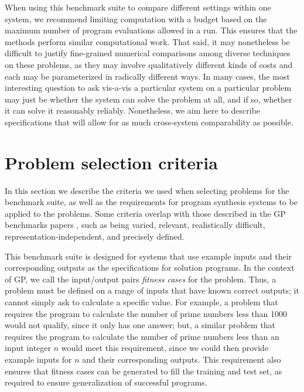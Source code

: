 \documentclass{sig-alternate}
\begin{document}
When using this benchmark suite to compare different settings within one system, we recommend limiting computation with a budget based on the maximum number of program evaluations allowed in a run. This ensures that the methods perform similar computational work. That said, it may nonetheless be difficult to justify fine-grained numerical comparisons among diverse techniques on these problems, as they may involve qualitatively different kinds of costs and each may be parameterized in radically different ways. In many cases, the most interesting question to ask vis-a-vis a particular system on a particular problem may just be whether the system can solve the problem at all, and if so,  whether it can solve it reasonably reliably. Nonetheless, we aim here to describe specifications that will allow for as much cross-system comparability as possible. %


\section{Problem selection criteria} \label{requirements}

In this section we describe the criteria we used when selecting problems for the benchmark suite, as well as the requirements for program synthesis systems to be applied to the problems. Some criteria overlap with those described in the GP benchmarks papers \cite{McDermott:2012:GECCO, White:2013:BGB:2441218.2441242}, such as being varied, relevant, realistically difficult, representation-independent, and precisely defined. 

This benchmark suite is designed for systems that use example inputs and their corresponding outputs as the specifications for solution programs. In the context of GP, we call the input/output pairs \textit{fitness cases} for the problem. Thus, a problem must be defined on a range of inputs that have known correct outputs; it cannot simply ask to calculate a specific value. For example, a problem that requires the program to calculate the number of prime numbers less than 1000 would not qualify, since it only has one answer; but, a similar problem that requires the program to calculate the number of prime numbers less than an input integer $n$ would meet this requirement, since we could then provide example inputs for $n$ and their corresponding outputs. This requirement also ensures that fitness cases can be generated to fill the training and test set, as required to ensure generalization of successful programs.
\end{document}
